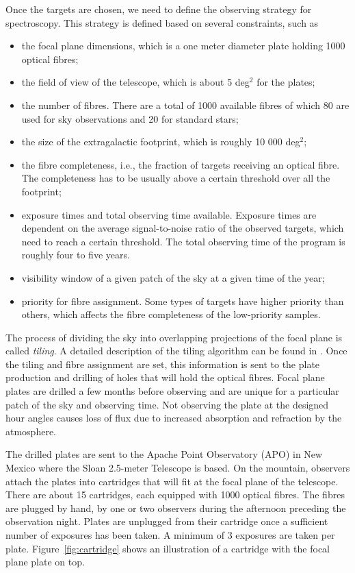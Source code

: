 Once the targets are chosen, we need to define the observing strategy
for spectroscopy. This strategy is defined based on several constraints, 
such as 
\begin{itemize}
    \item the focal plane dimensions, which is a one meter diameter plate holding 1000 optical fibres;
    \item the field of view of the telescope, which is about 5 deg$^2$ for the plates; 
    \item the number of fibres. There are a total of 1000 available fibres  of 
            which 80 are used for sky observations and 20 for standard stars; 
    \item the size of the extragalactic footprint, which is roughly 10 000 deg$^2$; 
    \item the fibre completeness, i.e., the fraction of targets receiving an 
          optical fibre. The completeness has to be usually above a certain 
          threshold over all the footprint;
    \item exposure times and total observing time available. 
        Exposure times are dependent on the average signal-to-noise ratio of 
        the observed targets, which need to reach a certain threshold. 
        The total observing time of the program is roughly four to five years. 
    \item visibility window of a given patch of the sky at a given time of the year; 
    \item priority for fibre assignment. Some types of targets have higher priority than others,
        which affects the fibre completeness of the low-priority samples.  
\end{itemize}

The process of dividing the sky into overlapping projections of the focal plane 
is called \emph{tiling}. A detailed description of the tiling algorithm can be found in 
\cite{blantonEfficientTargetingStrategy2003}. 
Once  the tiling and fibre assignment
are set, this information is sent to the plate production and drilling of holes 
that will hold the optical fibres. Focal plane plates are drilled a few months 
before observing and are unique for a particular patch of the sky and observing time. 
Not observing the plate at the designed hour angles causes loss of flux due to increased absorption and 
refraction by the atmosphere. 

The drilled plates are sent to the Apache Point Observatory (APO) in New Mexico
where the Sloan 2.5-meter Telescope is based. On the mountain, 
observers attach the plates into cartridges that will fit at the focal plane of the
telescope. There are about 15 cartridges, each equipped with 1000 optical fibres.
The fibres are plugged by hand, by one or two observers during the afternoon preceding 
the observation night. Plates are unplugged from their cartridge once a sufficient
number of exposures has been taken. A minimum of 3 exposures are taken per plate.
Figure~\ref{fig:cartridge} shows an illustration of a cartridge with the focal plane 
plate on top.

